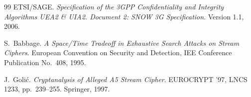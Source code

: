 \documentclass[11pt,a4paper]{ctexart}
\begin{document}
\begin{thebibliography}{99}
ETSI/SAGE. \emph{Specification of the 3GPP Confidentiality and Integrity Algorithms UEA2 \& UIA2. Document 2: SNOW 3G Specification}. Version 1.1, 2006.

S.~Babbage. \emph{A Space/Time Tradeoff in Exhaustive Search Attacks on Stream Ciphers}. European Convention on Security and Detection, IEE Conference Publication No.~408, 1995.

J.~Goli\'c. \emph{Cryptanalysis of Alleged A5 Stream Cipher}. EUROCRYPT '97, LNCS 1233, pp.~239--255. Springer, 1997.

\end{thebibliography}
\end{document}
